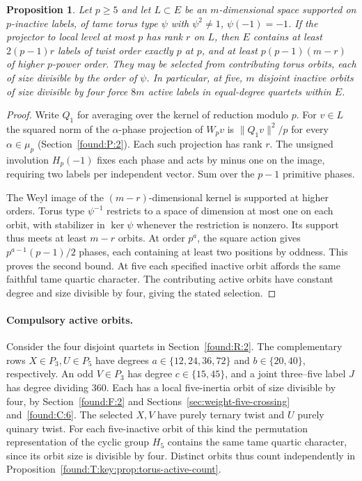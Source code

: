 \documentclass[11pt,a4paper]{article}
\numberwithin{equation}{section}
\newtheorem{proposition}[theorem]{Proposition}
\theoremstyle{remark}
\begin{document}
\begin{proposition}\label{found:T:1.1}\label{found:T:key:prop:torus-active-count}
Let $p\ge5$ and let $L\subset E$ be an $m$-dimensional space supported on $p$-inactive labels, of tame torus type $\psi$ with $\psi^2\ne1$, $\psi(-1)=-1$. If the projector to local level at most $p$ has rank $r$ on $L$, then $E$ contains at least $2(p-1)r$ labels of twist order exactly $p$ at $p$, and at least $p(p-1)(m-r)$ of higher $p$-power order. They may be selected from contributing torus orbits, each of size divisible by the order of $\psi$. In particular, at five, $m$ disjoint inactive orbits of size divisible by four force $8m$ active labels in equal-degree quartets within $E$.
\end{proposition}
\begin{proof}
Write $Q_1$ for averaging over the kernel of reduction modulo $p$. For $v\in L$ the squared norm of the $\alpha$-phase projection of $W_pv$ is $\|Q_1v\|^2/p$ for every $\alpha\in\mu_p$ (Section~\ref{found:P:2}). Each such projection has rank $r$. The unsigned involution $H_p(-1)$ fixes each phase and acts by minus one on the image, requiring two labels per independent vector. Sum over the $p-1$ primitive phases.

The Weyl image of the $(m-r)$-dimensional kernel is supported at higher orders. Torus type $\psi^{-1}$ restricts to a space of dimension at most one on each orbit, with stabilizer in $\ker\psi$ whenever the restriction is nonzero. Its support thus meets at least $m-r$ orbits. At order $p^a$, the square action gives $p^{a-1}(p-1)/2$ phases, each containing at least two positions by oddness. This proves the second bound. At five each specified inactive orbit affords the same faithful tame quartic character. The contributing active orbits have constant degree and size divisible by four, giving the stated selection.
\end{proof}

\paragraph{Compulsory active orbits.}\label{found:T:key:cor:core-lower-rank}
Consider the four disjoint quartets in Section~\ref{found:R:2}. The complementary rows $X\in P_3,U\in P_5$ have degrees
$a\in\{12,24,36,72\}$ and $b\in\{20,40\}$, respectively. An odd
$V\in P_3$ has degree $c\in\{15,45\}$, and a joint three--five label
$J$ has degree dividing $360$. Each has a local five-inertia orbit of
size divisible by four, by Section~\ref{found:F:2} and Sections~\ref{sec:weight-five-crossing} and~\ref{found:C:6}. The
selected $X,V$ have purely ternary twist and $U$ purely quinary twist.
For each five-inactive orbit of this kind the permutation representation
of the cyclic group $H_5$ contains the same tame quartic character,
since its orbit size is divisible by four. Distinct orbits thus count
independently in Proposition~\ref{found:T:key:prop:torus-active-count}.
\end{document}
